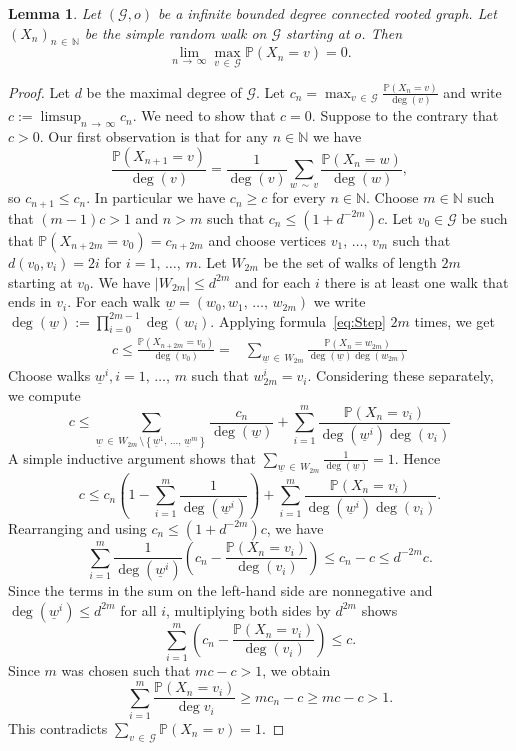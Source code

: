 \documentclass[10pt]{amsart}
\newtheorem{lemm}[theo]{Lemma}\newtheorem{prop}[theo]{Proposition}\newtheorem{coro}[theo]{Corollary}\newtheorem{conj}[theo]{Conjecture}
\theoremstyle{definition}\newtheorem{defi}[theo]{Definition}\newtheorem{rema}[theo]{Remark}\newtheorem{exam}[theo]{Example}\newtheorem{exem}[theo]{Example}\newtheorem{nota}[theo]{Notation}
\newcommand{\bbN}{\mathbb{N}}
\newcommand{\bbP}{\mathbb{P}}
\newcommand{\calG}{\mathcal{G}}
\begin{document}
\begin{lemm}\label{lem:ProbDecay}
Let $(\calG,o)$ be a infinite bounded degree connected rooted graph. Let $(X_n)_{n\,\in\,\bbN}$ be the simple random walk on $\calG$ starting at $o$. Then
\[
\displaystyle\lim_{n\,\to\,\infty}\max_{v\,\in\,\calG}\bbP(X_n=v)=0.
\]
\end{lemm}

\begin{proof}
Let $d$ be the maximal degree of $\calG$. Let $c_n=\max_{v\,\in\,\calG}\frac{\bbP(X_n=v)}{\deg(v)}$ and write $c:=\limsup_{n\,\to\,\infty}c_n$. We need to show that $c=0$. Suppose to the contrary that $c>0$. Our first observation is that for any $n\in\bbN$ we have
\begin{equation}\label{eq:Step}
\frac{\bbP(X_{n+1}=v)}{\deg(v)}=\frac{1}{\deg(v)}\sum_{w\,\sim\,v}\frac{\bbP(X_{n}=w)}{\deg(w)},
\end{equation}
so $c_{n+1}\leq c_n$. In particular we have $c_n\geq c$ for every $n\in \bbN$. Choose $m\in\bbN$ such that $(m-1)c > 1$ and $n> m$ such that $c_n\leq (1+d^{-2m})c.$ Let $v_0\in \calG$ be such that $\bbP(X_{n+2m}=v_0)=c_{n+2m}$ and choose vertices $v_1,\,\ldots,\,v_m$ such that $d(v_0,v_i)=2i$ for $i=1,\,\ldots,\,m$. Let $W_{2m}$ be the set of walks of length $2m$ starting at $v_0$. We have $|W_{2m}|\leq d^{2m}$ and for each $i$ there is at least one walk that ends in $v_i$. For each walk $\underline{w}=(w_0,w_1,\,\ldots,\,w_{2m})$ we write $\deg(\underline w):=\prod_{i=0}^{2m-1}\deg(w_i).$ Applying formula~\eqref{eq:Step} $2m$ times, we get
\begin{align*}
c\leq \frac{\bbP(X_{n+2m}=v_0)}{\deg(v_0)}=&\sum_{\underline w\,\in\,W_{2m}} \frac{\bbP(X_n=w_{2m})}{\deg(\underline w)\deg(w_{2m})}
\end{align*}
Choose walks $\underline{w}^i, i=1,\,\ldots,\,m$ such that $w_{2m}^i=v_i$. Considering these separately, we compute
\[
c\leq \sum_{\underline w\,\in\,W_{2m}\,\setminus\left\{\underline w^1,\,\ldots,\,\underline w^m\right\}} \frac{c_n}{\deg(\underline w)}+\sum_{i=1}^m \frac{\bbP(X_n=v_i)}{\deg(\underline{w}^i)\deg(v_i)}
\]
A simple inductive argument shows that $\sum_{\underline w\,\in\,W_{2m}}\frac{1}{\deg(\underline w)}=1$. Hence
\[
c\leq c_n\left(1-\sum_{i=1}^m \frac{1}{\deg(\underline w^i)}\right)+\sum_{i=1}^m \frac{\bbP(X_n=v_i)}{\deg(\underline{w}^i)\deg(v_i)}.
\]
Rearranging and using $c_n\leq (1+d^{-2m})c$, we have
\[
\sum_{i=1}^m\frac{1}{\deg(\underline w^i)}\left(c_n- \frac{\bbP(X_n=v_i)}{\deg(v_i)}\right)\leq c_n-c\leq d^{-2m}c.
\]
Since the terms in the sum on the left-hand side are nonnegative and $\deg(\underline w^i)\leq d^{2m}$ for all $i$, multiplying both sides by $d^{2m}$ shows
\[
\sum_{i=1}^m\left(c_n- \frac{\bbP(X_n=v_i)}{\deg(v_i)}\right)\leq c.
\]
Since $m$ was chosen such that $mc-c>1$, we obtain
\[
\sum_{i=1}^m \frac{\bbP(X_n=v_i)}{\deg v_i} \geq mc_n-c\geq mc-c>1.
\]
This contradicts $\sum_{v\,\in\,\calG} \bbP(X_n=v)=1$.
\end{proof}
\end{document}
